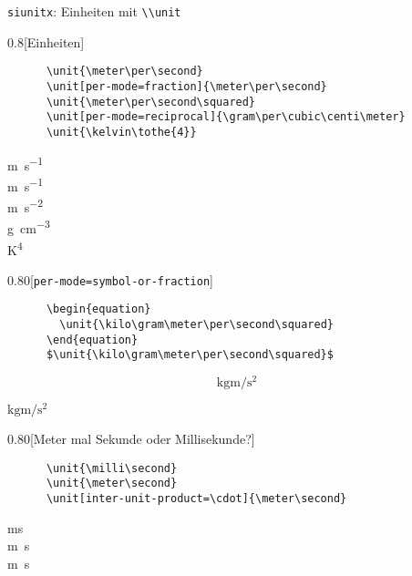 \begin{frame}[fragile]{\texttt{siunitx}: Einheiten mit \lstinline+\\unit+}
  \begin{CodeExample}{0.8}[Einheiten]
    \begin{lstlisting}
      \unit{\meter\per\second}
      \unit[per-mode=fraction]{\meter\per\second}
      \unit{\meter\per\second\squared}
      \unit[per-mode=reciprocal]{\gram\per\cubic\centi\meter}
      \unit{\kelvin\tothe{4}}
    \end{lstlisting}
  \CodeResult
    \strut
    \unit{\meter\per\second} \\
    \unit[per-mode=fraction]{\meter\per\second} \\
    \unit{\meter\per\second\squared} \\
    \unit[per-mode=reciprocal]{\gram\per\cubic\centi\meter} \\
    \unit{\kelvin\tothe{4}}
  \end{CodeExample}
  \begin{CodeExample}{0.80}[\texttt{per-mode=symbol-or-fraction}]
    \begin{lstlisting}
      \begin{equation}
        \unit{\kilo\gram\meter\per\second\squared}
      \end{equation}
      $\unit{\kilo\gram\meter\per\second\squared}$
    \end{lstlisting}
  \CodeResult
    \removedisplayskip
    \begin{minipage}[c][3\baselineskip][c]{\textwidth}
      \begin{equation}
        \unit{\kilo\gram\meter\per\second\squared}
      \end{equation}
    \end{minipage}
    $\unit{\kilo\gram\meter\per\second\squared}$
  \end{CodeExample}
  \begin{CodeExample}{0.80}[Meter mal Sekunde oder Millisekunde?]
    \begin{lstlisting}
      \unit{\milli\second}
      \unit{\meter\second}
      \unit[inter-unit-product=\cdot]{\meter\second}
    \end{lstlisting}
  \CodeResult
    \strut
    \unit{\milli\second} \\
    \unit{\meter\second} \\
    \unit[inter-unit-product=\cdot]{\meter\second}
  \end{CodeExample}
\end{frame}

